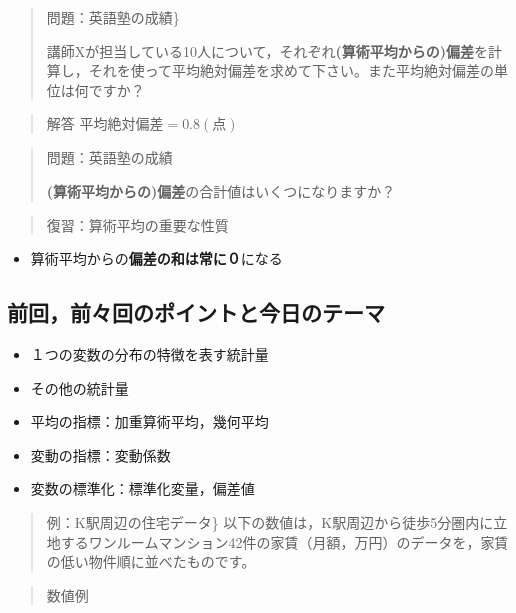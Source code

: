 \documentclass[
]{book}
\providecommand{\tightlist}{%
  \setlength{\itemsep}{0pt}\setlength{\parskip}{0pt}}
\theoremstyle{definition}
\theoremstyle{definition}
\theoremstyle{definition}
\theoremstyle{definition}
\theoremstyle{remark}
\begin{document}
\begin{quote}
問題：英語塾の成績\}

講師Xが担当している10人について，それぞれ\textbf{(算術平均からの)偏差}を計算し，それを使って平均絶対偏差を求めて下さい。また平均絶対偏差の単位は何ですか？
\end{quote}

\begin{quote}
解答 \(\text{平均絶対偏差}=0.8(\text{点})\)
\end{quote}

\begin{quote}
問題：英語塾の成績

\textbf{(算術平均からの)偏差}の合計値はいくつになりますか？
\end{quote}

\begin{quote}
復習：算術平均の重要な性質
\end{quote}

\begin{itemize}
\tightlist
\item
  算術平均からの\textbf{偏差の和は常に０}になる
\end{itemize}

\hypertarget{ux524dux56deux524dux3005ux56deux306eux30ddux30a4ux30f3ux30c8ux3068ux4ecaux65e5ux306eux30c6ux30fcux30de}{%
\subsection{前回，前々回のポイントと今日のテーマ}\label{ux524dux56deux524dux3005ux56deux306eux30ddux30a4ux30f3ux30c8ux3068ux4ecaux65e5ux306eux30c6ux30fcux30de}}

\begin{itemize}
\item
  １つの変数の分布の特徴を表す統計量
\item
  その他の統計量
\item
  平均の指標：加重算術平均，幾何平均
\item
  変動の指標：変動係数
\item
  変数の標準化：標準化変量，偏差値
\end{itemize}

\begin{quote}
例：K駅周辺の住宅データ\}
以下の数値は，K駅周辺から徒歩5分圏内に立地するワンルームマンション42件の家賃（月額，万円）のデータを，家賃の低い物件順に並べたものです。
\end{quote}

\begin{quote}
数値例
\end{quote}
\end{document}

